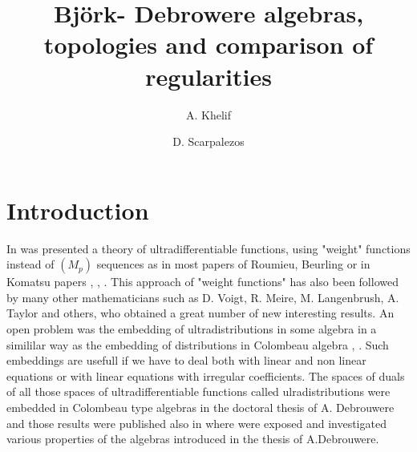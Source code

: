 \documentclass[12pt,a4paper]{amsart}
\begin{document}
	




\title{Bj\"{o}rk- Debrowere algebras, topologies and comparison of regularities}

\author{A. Khelif}
\author{D. Scarpalezos}
\address{Universite Paris 7\\
	Paris\\ France}
\maketitle






 
\section{Introduction }
In \cite{Bj.1} was presented a theory of ultradifferentiable functions, using "weight" functions instead of $(M_p)$ sequences as in most papers of Roumieu, Beurling or in Komatsu papers \cite{Komatsu.1}, \cite{Komatsu.2}, \cite{Komatsu.3}.
 This approach of "weight functions"  has also been followed by many other mathematicians such as D. Voigt, R. Meire, M. Langenbrush, A. Taylor and others, who obtained a great number of new interesting results. An open problem was the embedding of ultradistributions in some algebra in a simililar way as the embedding of distributions in Colombeau algebra \cite{Col.1}, \cite{Ober.1}. Such embeddings are usefull if we have to deal both with linear and non linear equations or with linear equations with irregular coefficients. 
 The spaces of duals of all those spaces of ultradifferentiable functions called ulradistributions were embedded in Colombeau type algebras in the doctoral thesis of A. Debrouwere and those results were published also in \cite{D.V.V.} where were exposed and investigated various properties of the algebras introduced in the thesis of A.Debrouwere.
   
\end{document}
